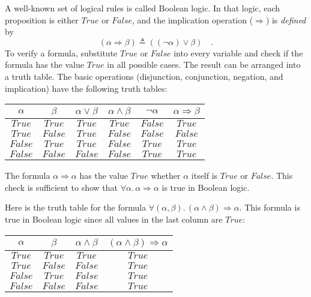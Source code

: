 A well-known set of logical rules is called Boolean
logic. In that logic, each proposition is either $True$ or $False$,
and the implication operation ($\Rightarrow$) is \emph{defined} by
\begin{equation}
\left(\alpha\Rightarrow\beta\right)\triangleq\left((\neg\alpha)\vee\beta\right)\quad.\label{eq:ch-definition-of-implication-in-Boolean-logic}
\end{equation}
To verify a formula, substitute $True$ or $False$ into every variable
and check if the formula has the value $True$ in all possible cases.
The result can be arranged into a truth table.
The basic operations (disjunction, conjunction, negation, and implication)
have the following truth tables:
\begin{center}
{\small{}}%
\begin{tabular}{|c|c|c|c|c|c|}
\hline 
{\small{}$\alpha$} & {\small{}$\beta$} & \textbf{\small{}$\alpha\vee\beta$} & \textbf{\small{}$\alpha\wedge\beta$} & \textbf{\small{}$\neg\alpha$} & \textbf{\small{}$\alpha\Rightarrow\beta$}\tabularnewline
\hline 
\hline 
{\small{}$True$} & {\small{}$True$} & {\small{}$True$} & {\small{}$True$} & {\small{}$False$} & {\small{}$True$}\tabularnewline
\hline 
{\small{}$True$} & {\small{}$False$} & {\small{}$True$} & {\small{}$False$} & {\small{}$False$} & {\small{}$False$}\tabularnewline
\hline 
{\small{}$False$} & {\small{}$True$} & {\small{}$True$} & {\small{}$False$} & {\small{}$True$} & {\small{}$True$}\tabularnewline
\hline 
{\small{}$False$} & {\small{}$False$} & {\small{}$False$} & {\small{}$False$} & {\small{}$True$} & {\small{}$True$}\tabularnewline
\hline 
\end{tabular}{\small\par}
\par\end{center}

The formula $\alpha\Rightarrow\alpha$ has the value $True$ whether
$\alpha$ itself is $True$ or $False$. This check is sufficient
to show that $\forall\alpha.\,\alpha\Rightarrow\alpha$ is true in
Boolean logic.

Here is the truth table for the formula $\forall(\alpha,\beta).\,(\alpha\wedge\beta)\Rightarrow\alpha$.
This formula is true in Boolean logic since all values in the last
column are $True$:
\begin{center}
{\small{}}%
\begin{tabular}{|c|c|c|c|}
\hline 
{\small{}$\alpha$} & {\small{}$\beta$} & \textbf{\small{}$\alpha\wedge\beta$} & {\small{}$(\alpha\wedge\beta)\Rightarrow\alpha$}\tabularnewline
\hline 
\hline 
{\small{}$True$} & {\small{}$True$} & {\small{}$True$} & {\small{}$True$}\tabularnewline
\hline 
{\small{}$True$} & {\small{}$False$} & {\small{}$False$} & {\small{}$True$}\tabularnewline
\hline 
{\small{}$False$} & {\small{}$True$} & {\small{}$False$} & {\small{}$True$}\tabularnewline
\hline 
{\small{}$False$} & {\small{}$False$} & {\small{}$False$} & {\small{}$True$}\tabularnewline
\hline 
\end{tabular}{\small\par}
\par\end{center}

